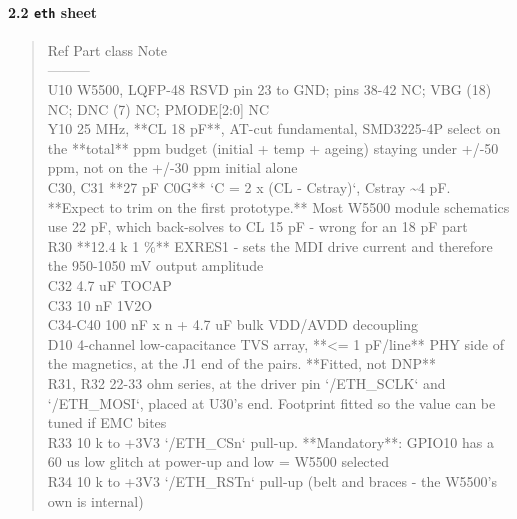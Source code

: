 \documentclass[11pt,a4paper]{article}
\begin{document}
\paragraph*{2.2 \texttt{eth} sheet}
\begin{quote}\small\ttfamily\raggedright
\textbar{} Ref \textbar{} Part class \textbar{} Note \textbar{}\\
\textbar{}---\textbar{}---\textbar{}---\textbar{}\\
\textbar{} U10 \textbar{} W5500, LQFP-48 \textbar{} RSVD pin 23 to GND; pins 38-42 NC; VBG (18) NC; DNC (7) NC; PMODE{[}2:0{]} NC \textbar{}\\
\textbar{} Y10 \textbar{} 25 MHz, {*}{*}CL 18 pF{*}{*}, AT-cut fundamental, SMD3225-4P \textbar{} select on the {*}{*}total{*}{*} ppm budget (initial + temp + ageing) staying under +/-50 ppm, not on the +/-30 ppm initial alone \textbar{}\\
\textbar{} C30, C31 \textbar{} {*}{*}27 pF C0G{*}{*} \textbar{} `C = 2 x (CL - Cstray)`, Cstray \textasciitilde{}4 pF. {*}{*}Expect to trim on the first prototype.{*}{*} Most W5500 module schematics use 22 pF, which back-solves to CL 15 pF - wrong for an 18 pF part \textbar{}\\
\textbar{} R30 \textbar{} {*}{*}12.4 k 1 \%{*}{*} \textbar{} EXRES1 - sets the MDI drive current and therefore the 950-1050 mV output amplitude \textbar{}\\
\textbar{} C32 \textbar{} 4.7 uF \textbar{} TOCAP \textbar{}\\
\textbar{} C33 \textbar{} 10 nF \textbar{} 1V2O \textbar{}\\
\textbar{} C34-C40 \textbar{} 100 nF x n + 4.7 uF bulk \textbar{} VDD/AVDD decoupling \textbar{}\\
\textbar{} D10 \textbar{} 4-channel low-capacitance TVS array, {*}{*}\textless{}= 1 pF/line{*}{*} \textbar{} PHY side of the magnetics, at the J1 end of the pairs. {*}{*}Fitted, not DNP{*}{*} \textbar{}\\
\textbar{} R31, R32 \textbar{} 22-33 ohm series, at the driver pin \textbar{} `/ETH\_SCLK` and `/ETH\_MOSI`, placed at U30's end. Footprint fitted so the value can be tuned if EMC bites \textbar{}\\
\textbar{} R33 \textbar{} 10 k to +3V3 \textbar{} `/ETH\_CSn` pull-up. {*}{*}Mandatory{*}{*}: GPIO10 has a 60 us low glitch at power-up and low = W5500 selected \textbar{}\\
\textbar{} R34 \textbar{} 10 k to +3V3 \textbar{} `/ETH\_RSTn` pull-up (belt and braces - the W5500's own is internal) \textbar{}
\end{quote}
\end{document}
